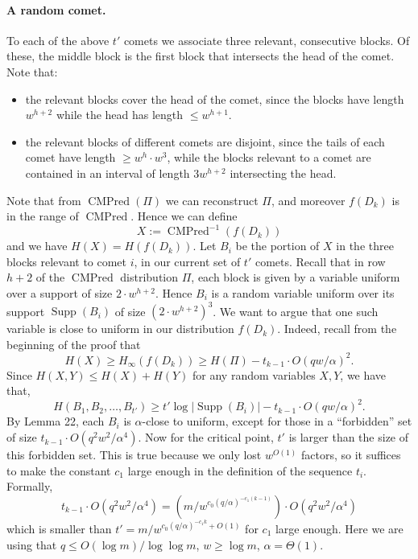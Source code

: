 \paragraph{A random comet.}
To each of the above $t'$ comets we associate three relevant, consecutive blocks. Of these, the middle block is the first block that intersects the head of the comet. Note that:
\begin{itemize}
\item the relevant blocks cover the head of the comet, since the blocks have length $w^{h+2}$ while the head has length $\leq w^{h+1}$.
\item the relevant blocks of different comets are disjoint, since the tails of each comet have length $\geq w^h\cdot w^3$, while the blocks relevant to a comet are contained in an interval of length $3w^{h+2}$ intersecting the head.
\end{itemize}
Note that from $\operatorname{CMPred}(\Pi)$ we can reconstruct $\Pi$, and moreover $f(D_k)$ is in the range of $\operatorname{CMPred}$. Hence we can define
\[X:=\operatorname{CMPred}^{-1}(f(D_k))\]
and we have $H(X)=H(f(D_k))$. Let $B_i$ be the portion of $X$ in the three blocks relevant to comet $i$, in our current set of $t'$ comets. Recall that in row $h+2$ of the $\operatorname{CMPred}$ distribution $\Pi$, each block is given by a variable uniform over a support of size $2\cdot w^{h+2}$. Hence $B_i$ is a random variable uniform over its support $\operatorname{Supp}(B_i)$ of size $(2\cdot w^{h+2})^3$.
We want to argue that one such variable is close to uniform in our distribution $f(D_k)$. Indeed, recall from the beginning of the proof that
\[H(X)\geq H_\infty(f(D_k))\geq H(\Pi)-t_{k-1}\cdot O(qw/\alpha)^2.\]
Since $H(X,Y)\leq H(X)+H(Y)$ for any random variables $X,Y$, we have that,
\[H(B_1,B_2,\ldots,B_{t'})\geq t'\log|\operatorname{Supp}(B_i)|-t_{k-1}\cdot O(qw/\alpha)^2.\]
By Lemma 22, each $B_i$ is $\alpha$-close to uniform, except for those in a ``forbidden'' set of size $t_{k-1}\cdot O(q^2w^2/\alpha^4)$.
Now for the critical point, $t'$ is larger than the size of this forbidden set. This is true because we only lost $w^{O(1)}$ factors, so it suffices to make the constant $c_1$ large enough in the definition of the sequence $t_i$. Formally,
\[t_{k-1}\cdot O(q^2w^2/\alpha^4)=(m/w^{c_0(q/\alpha)^{-c_1(k-1)}})\cdot O(q^2w^2/\alpha^4)\]
which is smaller than $t'=m/w^{c_0(q/\alpha)^{-c_1k}+O(1)}$ for $c_1$ large enough. Here we are using that $q\leq O(\log m)/\log\log m$, $w\geq\log m$, $\alpha=\Theta(1)$.
